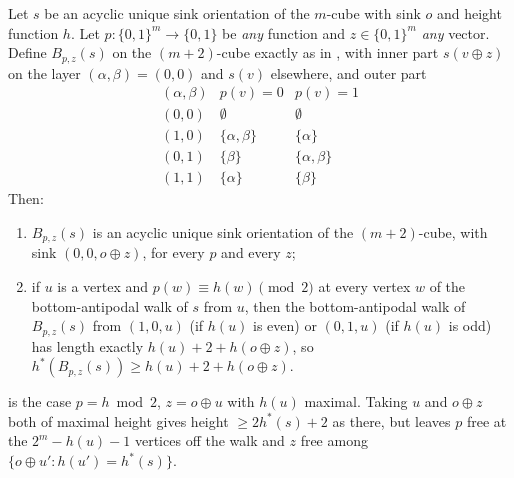 \begin{theorem}\label{b3:free-parity}
Let $s$ be an acyclic unique sink orientation of the $m$-cube with sink $o$ and
height function $h$. Let $p:\{0,1\}^{m}\to\{0,1\}$ be \emph{any} function and
$z\in\{0,1\}^{m}$ \emph{any} vector. Define $B_{p,z}(s)$ on the
$(m+2)$-cube exactly as in , with inner part $s(v\oplus z)$ on
the layer $(\alpha,\beta)=(0,0)$ and $s(v)$ elsewhere, and outer part
\[
 \begin{array}{c|cc}
   (\alpha,\beta) & p(v)=0 & p(v)=1\\ \hline
   (0,0) & \emptyset & \emptyset\\
   (1,0) & \{\alpha,\beta\} & \{\alpha\}\\
   (0,1) & \{\beta\} & \{\alpha,\beta\}\\
   (1,1) & \{\alpha\} & \{\beta\}
 \end{array}
\]
Then:
\begin{enumerate}[label=(\alph*),leftmargin=2.2em]
\item $B_{p,z}(s)$ is an acyclic unique sink orientation of the $(m+2)$-cube,
      with sink $(0,0,o\oplus z)$, for every $p$ and every $z$;
\item if $u$ is a vertex and $p(w)\equiv h(w)\pmod 2$ at every vertex $w$ of
      the bottom-antipodal walk of $s$ from $u$, then the bottom-antipodal
      walk of $B_{p,z}(s)$ from $(1,0,u)$ (if $h(u)$ is even) or $(0,1,u)$ (if
      $h(u)$ is odd) has length exactly $h(u)+2+h(o\oplus z)$, so
      $h^{\ast}(B_{p,z}(s))\ge h(u)+2+h(o\oplus z)$.
\end{enumerate}
 is the case $p=h\bmod 2$, $z=o\oplus u$ with $h(u)$ maximal.
Taking $u$ and $o\oplus z$ both of maximal height gives height $\ge 2h^{\ast}(s)+2$
as there, but leaves $p$ free at the $2^{m}-h(u)-1$ vertices off the walk and
$z$ free among $\{o\oplus u':h(u')=h^{\ast}(s)\}$.
\end{theorem}

